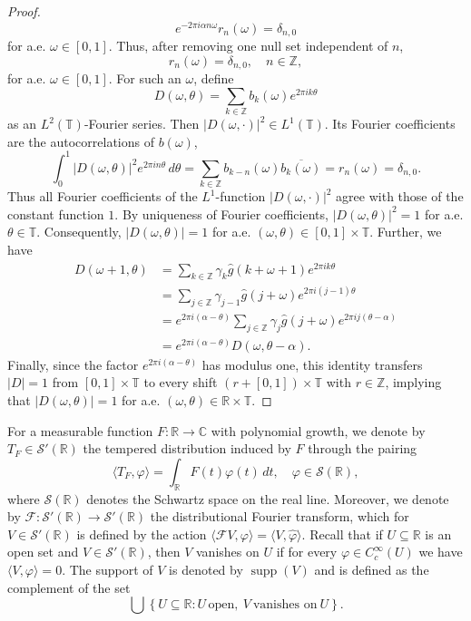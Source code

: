 \documentclass[reqno,a4paper,12pt]{amsart}
\numberwithin{equation}{section}
\def\R{{\mathbb R}}
\def\T{{\mathbb T}}
\def\C{{\mathbb C}}
\newcommand{\ft}{{\mathcal{F}}}
\newcommand{\supp}{\operatorname{supp}}
\newcommand\1{\mathds{1}}
\begin{document}
\begin{proof}
$$e^{-2\pi i\alpha n\omega}r_n(\omega)=\delta_{n,0}
$$
for a.e. $\omega\in[0,1]$. Thus, after removing one null set independent of $n$,
$$
r_n(\omega)=\delta_{n,0}, \quad n \in \mathbb Z,
$$
for a.e. $\omega\in[0,1]$.
For such an $\omega$, define
$$
D(\omega,\theta) = \sum_{k\in\mathbb Z}b_k(\omega)e^{2\pi i k\theta}
$$
as an $L^2(\T)$-Fourier series. Then $|D(\omega,\cdot)|^2\in L^1(\T)$. Its Fourier coefficients are the autocorrelations of $b(\omega)$,
$$
\int_0^1 |D(\omega,\theta)|^2e^{2\pi i n\theta}\,d\theta = \sum_{k\in\mathbb Z} b_{k-n}(\omega)\overline{b_k(\omega)} = r_n(\omega) = \delta_{n,0}.
$$
Thus all Fourier coefficients of the $L^1$-function $|D(\omega,\cdot)|^2$ agree with those of the constant function $1$. By uniqueness of Fourier coefficients, $|D(\omega,\theta)|^2=1$ for a.e. $\theta\in \T $. Consequently, $|D(\omega,\theta)|=1$ for a.e. $(\omega,\theta)\in[0,1]\times \T$.
Further, we have
$$
\begin{aligned}
D(\omega+1,\theta)
&=
\sum_{k\in\mathbb Z}
\gamma_k\widehat g(k+\omega+1)e^{2\pi i k\theta}  \\
&=
\sum_{j\in\mathbb Z}
\gamma_{j-1}\widehat g(j+\omega)e^{2\pi i(j-1)\theta}  \\
&=
e^{2\pi i(\alpha-\theta)}
\sum_{j\in\mathbb Z}
\gamma_j\widehat g(j+\omega)e^{2\pi i j(\theta-\alpha)}  \\
&=
e^{2\pi i(\alpha-\theta)}D(\omega,\theta-\alpha).
\end{aligned}
$$
Finally, since the factor $e^{2\pi i(\alpha-\theta)}$ has modulus one, this identity transfers $|D|=1$ from $[0,1]\times \T$ to every shift $(r+[0,1])\times \T$ with $r\in\mathbb Z$, implying that $|D(\omega,\theta)|=1$ for a.e. $(\omega,\theta)\in\mathbb R\times \T$.
\end{proof}

For a measurable function $F : \R \to \C$ with polynomial growth, we denote by $T_F \in \mathcal S'(\R)$ the tempered distribution induced by $F$ through the pairing
$$
        \langle T_F,\varphi\rangle
        =
        \int_{\mathbb R}F(t)\varphi(t)\,dt,
        \quad \varphi\in\mathcal S(\mathbb R),
$$
where $\mathcal{S}(\R)$ denotes the Schwartz space on the real line.
Moreover, we denote by $\ft : \mathcal S'(\R) \to \mathcal{S}'(\R)$ the distributional Fourier transform, which for $V \in \mathcal{S}'(\R)$ is defined by the action
$
\langle \ft V,\varphi \rangle = \langle V, \widehat \varphi \rangle.
$
Recall that if $U \subseteq \R$ is an open set and $V \in \mathcal{S}'(\R)$, then $V$ vanishes on $U$ if for every $\varphi \in C_c^\infty(U)$ we have $\langle V, \varphi \rangle = 0$. The support of $V$ is denoted by $\supp(V)$ and is defined as the complement of the set
$$
\bigcup \left \{ U \subseteq \R : U \, \text{open}, \ V \ \text{vanishes on} \ U \right \}.
$$
\end{document}
